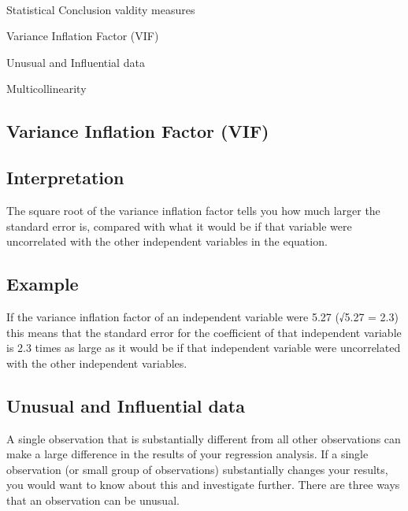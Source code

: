 
 

 



Statistical Conclusion valdity measures

Variance Inflation Factor (VIF)

Unusual and Influential data

Multicollinearity



\subsection*{Variance Inflation Factor (VIF)}

\subsection*{Interpretation}

The square root of the variance inflation factor tells you how much larger the standard error is, compared with what it would be if that variable were uncorrelated with the other independent variables in the equation.

 

\subsection*{Example}

If the variance inflation factor of an independent variable were 5.27 (√5.27 = 2.3) this means that the standard error for the coefficient of that independent variable is 2.3 times as large as it would be if that independent variable were uncorrelated with the other independent variables.

 

 


\subsection*{Unusual and Influential data}

A single observation that is substantially different from all other observations can make a large difference in the results of your regression analysis.  If a single observation (or small group of observations) substantially changes your results, you would want to know about this and investigate further.  There are three ways that an observation can be unusual.

